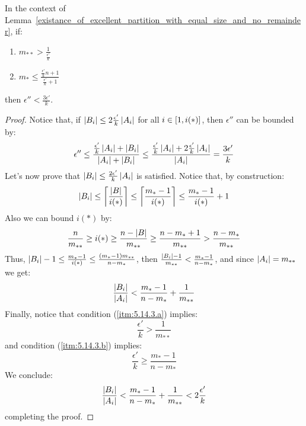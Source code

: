 
    \remark[Remark 5.14.3]\label{epsilons_proportion_can_be_k}
        In the context of Lemma~\ref{existance_of_excellent_partition_with_equal_size_and_no_remainder}, if:
        \begin{enumerate}[label=(\alph*), ref=\alph*]
            \item \label{itm:5.14.3.a} $m_{**} > \frac{1}{\frac{\epsilon'}{k}}$
            \item \label{itm:5.14.3.b} $m_* \leq \frac{\frac{\epsilon'}{k} n + 1}{\frac{\epsilon'}{k} + 1}$
        \end{enumerate}
        then $\epsilon'' < \frac{3 \epsilon'}{k}$.
        \begin{proof}
            Notice that, if $\left| B_i \right| \leq 2 \frac{\epsilon'}{k} \left| A_i \right|$ for all $i \in \left[ 1, i(*) \right]$,
            then $\epsilon''$ can be bounded by:
            $$
                \epsilon'' \leq \frac{\frac{\epsilon'}{k} \left| A_i \right| + \left| B_i \right|}{\left| A_i \right| + \left| B_i \right|}
                \leq \frac{\frac{\epsilon'}{k} \left| A_i \right| + 2 \frac{\epsilon'}{k} \left| A_i \right|}{\left| A_i \right|}
                = \frac{3 \epsilon'}{k}
            $$
            Let's now prove that $\left| B_i \right| \leq \frac{2 \epsilon'}{k} \left| A_i \right|$ is satisfied.
            Notice that, by construction:
            $$
                \left| B_i \right| \leq \left\lceil \frac{\left| B \right|}{i(*)} \right\rceil \leq \left\lceil \frac{m_* - 1}{i(*)} \right\rceil \leq
                \frac{m_* - 1}{i(*)} + 1
            $$
            Also we can bound $i(*)$ by:
            $$
                \frac{n}{m_{**}} \geq i(*) \geq \frac{n - \left| B \right|}{m_{**}} \geq \frac{n - m_* + 1}{m_{**}} >
                \frac{n - m_*}{m_{**}}
            $$
            Thus, $\left| B_i \right| - 1 \leq \frac{m_* - 1}{i(*)} \leq \frac{\left( m_* - 1 \right) m_{**}}{n - m_*}$,
            then $\frac{\left| B_i \right| - 1}{m_{**}} < \frac{m_* - 1}{n - m_*}$, and since $\left| A_i \right| = m_{**}$
            we get:
            $$
                \frac{\left| B_i \right|}{\left| A_i \right|} < \frac{m_* - 1}{n - m_*} + \frac{1}{m_{**}}
            $$
            Finally, notice that condition (\ref{itm:5.14.3.a}) implies:
            $$
                \frac{\epsilon'}{k} > \frac{1}{m_{**}}
            $$
            and condition (\ref{itm:5.14.3.b}) implies:
            $$
                \frac{\epsilon'}{k} \geq \frac{m_* - 1}{n - m_*}
            $$
            We conclude:
            $$
                \frac{\left| B_i \right|}{\left| A_i \right|} < \frac{m_* - 1}{n - m_*} + \frac{1}{m_{**}} < 2 \frac{\epsilon'}{k}
            $$
            completing the proof.
        \end{proof}

